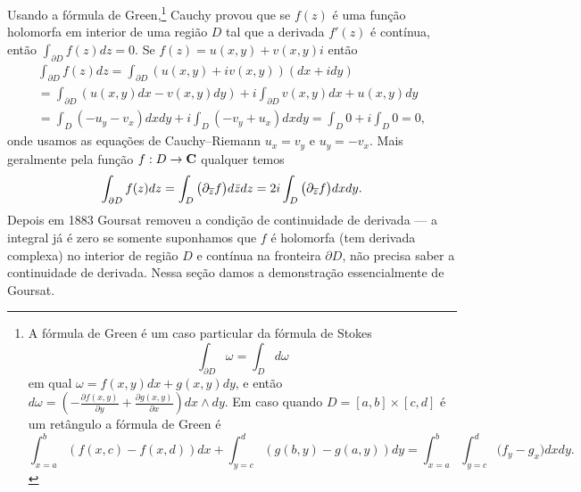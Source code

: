 \begin{remark}
Usando a fórmula de Green,\footnote{
A fórmula de Green 
é um caso particular da fórmula de Stokes 
$$\int_{\partial D} \omega = \int_D d\omega$$
em qual $\omega = f(x,y) dx + g(x,y) dy$, e então
$d\omega = (-\frac{\partial f(x,y)}{\partial y} + \frac{\partial g(x,y)}{\partial x}) dx\wedge dy$.
Em caso quando $D = [a,b] \times [c,d]$ é um retângulo a fórmula de Green é
\[ \int_{x=a}^b (f(x,c)-f(x,d)) dx + \int_{y=c}^d (g(b,y)-g(a,y)) dy
 = \int_{x=a}^b \int_{y=c}^d \big(f_y - g_x) dx dy . \]
}
Cauchy provou que se $f(z)$ é uma função holomorfa em interior de uma região $D$
tal que a derivada $f'(z)$ é contínua, então $\int_{\partial D} f(z) dz = 0$.
Se $f(z) = u(x,y) + v(x,y) i$ então
\begin{multline*}
\int_{\partial D} f(z) dz = \int_{\partial D} (u(x,y) + i v(x,y)) (dx + i dy) \\
= \int_{\partial D} (u(x,y) dx - v(x,y) dy) + i \int_{\partial D} v(x,y) dx + u(x,y) dy \\
= \int_D (-u_y-v_x) dx dy + i \int_D (-v_y + u_x) dx dy = \int_D 0 + i \int_D 0 = 0,
\end{multline*}
onde usamos as equações de Cauchy--Riemann $u_x = v_y$ e $u_y = - v_x$.
Mais geralmente pela função $f : D \to \mathbf{C}$ qualquer temos
\[ \int_{\partial D} f(z) dz =  \int_D \big(\partial_{\overline{z}} f\big) d\bar{z} dz
= 2i \int_D \big(\partial_{\overline{z}} f\big) dx dy. \]
Depois em 1883 Goursat removeu a condição de continuidade de derivada ---
a integral já é zero se somente suponhamos que $f$ é holomorfa
(tem derivada complexa) no interior de região $D$ e contínua na fronteira $\partial D$,
não precisa saber a continuidade de derivada.
Nessa seção damos a demonstração essencialmente de Goursat.
\end{remark}

